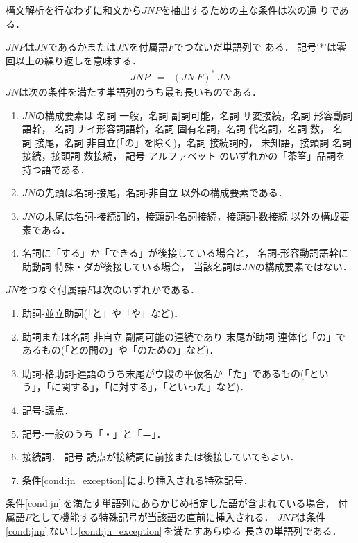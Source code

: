 構文解析を行なわずに和文から{\JNP}$JNP$を抽出するための主な条件は次の通
りである．
\begin{COND}
\cond \label{cond:jnp}
{\JNP}$JNP$は{\N}$JN$であるかまたは$JN$を付属語$F$でつないだ単語列で
ある．
記号`*'は零回以上の繰り返しを意味する．
\begin{eqnarray*}
JNP &=& (JN\ F)^*\ JN
\end{eqnarray*}
\cond \label{cond:jn}
{\N}$JN$は次の条件を満たす単語列のうち最も長いものである．
\begin{enumerate}
\item
$JN$の構成要素は
名詞-一般，名詞-副詞可能，名詞-サ変接続，名詞-形容動詞語幹，
名詞-ナイ形容詞語幹，名詞-固有名詞，名詞-代名詞，名詞-数，
名詞-接尾，名詞-非自立(「の」を除く)，名詞-接続詞的，  
未知語，接頭詞-名詞接続，接頭詞-数接続，
記号-アルファベット
のいずれかの「茶筌」品詞を持つ語である．
\item
$JN$の先頭は名詞-接尾，名詞-非自立
以外の構成要素である．
\item
$JN$の末尾は名詞-接続詞的，接頭詞-名詞接続，接頭詞-数接続
以外の構成要素である．
\item
名詞に「する」か「できる」が後接している場合と，
名詞-形容動詞語幹に助動詞-特殊・ダが後接している場合，
当該名詞は$JN$の構成要素ではない．
\end{enumerate}
\cond \label{cond:joshi}
$JN$をつなぐ付属語$F$は次のいずれかである．
\begin{enumerate}
\item
助詞-並立助詞(「と」や「や」など)．
\item
助詞または名詞-非自立-副詞可能の連続であり
末尾が助詞-連体化「の」であるもの(「との間の」や「のための」など)．
\item
助詞-格助詞-連語のうち末尾がウ段の平仮名か「た」であるもの(「とい
う」，「に関する」，「に対する」，「といった」など)．
\item 
記号-読点．
\item
記号-一般のうち「・」と「＝」．
\item
接続詞．
記号-読点が接続詞に前接または後接していてもよい．
\item
条件\ref{cond:jn_exception}\,により挿入される特殊記号．
\end{enumerate}
\cond \label{cond:jn_exception}
条件\ref{cond:jn}\,を満たす単語列にあらかじめ指定した語が含まれている場合，
付属語$F$として機能する特殊記号が当該語の直前に挿入される．
\cond \label{cond:jlength}
$JNP$は条件\ref{cond:jnp}\,ないし\ref{cond:jn_exception}\,を満たすあらゆる
長さの単語列である．
\end{COND}

